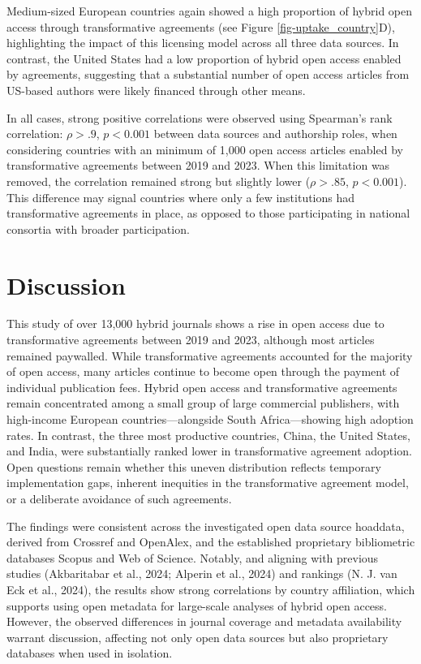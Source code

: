 \documentclass[a4paper,man,floatsintext,longtable,noextraspace,10pt]{apa6}
\begin{document}
Medium-sized European countries again showed a high proportion of hybrid
open access through transformative agreements (see Figure
\ref{fig-uptake_country}D), highlighting the impact of this licensing
model across all three data sources. In contrast, the United States had
a low proportion of hybrid open access enabled by agreements, suggesting
that a substantial number of open access articles from US-based authors
were likely financed through other means.

In all cases, strong positive correlations were observed using
Spearman's rank correlation: \(\rho > .9\), \(p < 0.001\) between data
sources and authorship roles, when considering countries with an minimum
of 1,000 open access articles enabled by transformative agreements
between 2019 and 2023. When this limitation was removed, the correlation
remained strong but slightly lower (\(\rho > .85\), \(p < 0.001\)). This
difference may signal countries where only a few institutions had
transformative agreements in place, as opposed to those participating in
national consortia with broader participation.

\section{Discussion}\label{discussion}

This study of over 13,000 hybrid journals shows a rise in open access
due to transformative agreements between 2019 and 2023, although most
articles remained paywalled. While transformative agreements accounted
for the majority of open access, many articles continue to become open
through the payment of individual publication fees. Hybrid open access
and transformative agreements remain concentrated among a small group of
large commercial publishers, with high-income European
countries---alongside South Africa---showing high adoption rates. In
contrast, the three most productive countries, China, the United States,
and India, were substantially ranked lower in transformative agreement
adoption. Open questions remain whether this uneven distribution
reflects temporary implementation gaps, inherent inequities in the
transformative agreement model, or a deliberate avoidance of such
agreements.

The findings were consistent across the investigated open data source
hoaddata, derived from Crossref and OpenAlex, and the established
proprietary bibliometric databases Scopus and Web of Science. Notably,
and aligning with previous studies (Akbaritabar et al., 2024; Alperin et
al., 2024) and rankings (N. J. van Eck et al., 2024), the results show
strong correlations by country affiliation, which supports using open
metadata for large-scale analyses of hybrid open access. However, the
observed differences in journal coverage and metadata availability
warrant discussion, affecting not only open data sources but also
proprietary databases when used in isolation.
\end{document}
